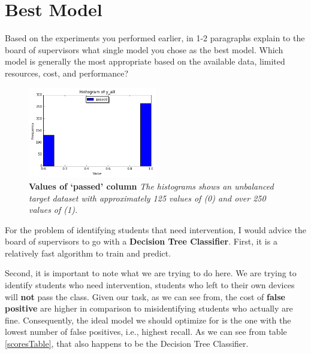 \documentclass[12pt]{article}
\begin{document}

\section*{Best Model}
Based on the experiments you performed earlier, in 1-2 paragraphs explain to the board of supervisors what single model you chose as the best model. Which model is generally the most appropriate based on the available data, limited resources, cost, and performance?

\begin{figure}[!htbp]
  \centering
    \includegraphics[width=0.5\textwidth]{images/y_all}
\caption{\textbf{Values of `passed' column} \textit{The histograms shows an unbalanced target dataset with approximately 125 values of (0) and over 250 values of (1).}}
\end{figure}


For the problem of identifying students that need intervention, I would advice the board of supervisors to go with a \textbf{Decision Tree Classifier}. First, it is a relatively fast algorithm to train and predict. 

Second, it is important to note what we are trying to do here. We are trying to identify students who need intervention, students who left to their own devices will \textbf{not} pass the class. Given our task, as we can see from, the cost of \textbf{false positive} are higher in comparison to misidentifying students who actually are fine. Consequently, the ideal model we should optimize for is the one with the lowest number of false positives, i.e., highest recall. As we can see from table \ref{scoresTable}, that also happens to be the Decision Tree Classifier. 








\end{document}
